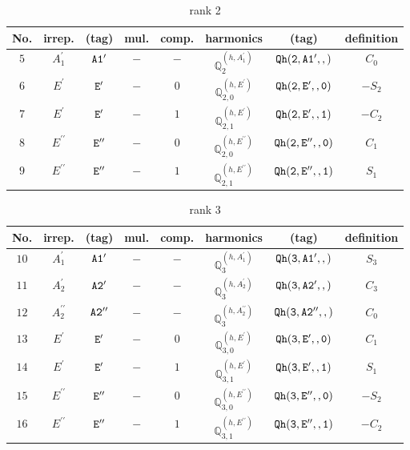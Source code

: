 \documentclass[fleqn,8pt]{jsarticle}
\begin{document}
\begin{table}[ht!]
\begin{center}
\caption{rank 2}
\renewcommand{\arraystretch}{1.3}
\begin{tabular}{cccccccc} \hline \hline
No. & irrep. & (tag) & mul. & comp. & harmonics & (tag) & definition \\ \hline
$ 5 $ & $ A_{1}^{\prime} $ & $ {\tt A1'} $ & $ - $ & $ - $ & $ \mathbb{Q}_{2}^{(h,A_{1}^{\prime})} $ & $ {\tt Qh(2,A1',,)} $ & $ C_{0} $ \\
$ 6 $ & $ E^{\prime} $ & $ {\tt E'} $ & $ - $ & $ 0 $ & $ \mathbb{Q}_{2,0}^{(h,E^{\prime})} $ & $ {\tt Qh(2,E',,0)} $ & $ - S_{2} $ \\
$ 7 $ & $ E^{\prime} $ & $ {\tt E'} $ & $ - $ & $ 1 $ & $ \mathbb{Q}_{2,1}^{(h,E^{\prime})} $ & $ {\tt Qh(2,E',,1)} $ & $ - C_{2} $ \\
$ 8 $ & $ E^{\prime\prime} $ & $ {\tt E''} $ & $ - $ & $ 0 $ & $ \mathbb{Q}_{2,0}^{(h,E^{\prime\prime})} $ & $ {\tt Qh(2,E'',,0)} $ & $ C_{1} $ \\
$ 9 $ & $ E^{\prime\prime} $ & $ {\tt E''} $ & $ - $ & $ 1 $ & $ \mathbb{Q}_{2,1}^{(h,E^{\prime\prime})} $ & $ {\tt Qh(2,E'',,1)} $ & $ S_{1} $ \\
 \hline \hline
\end{tabular}
\end{center}
\end{table}
\begin{table}[ht!]
\begin{center}
\caption{rank 3}
\renewcommand{\arraystretch}{1.3}
\begin{tabular}{cccccccc} \hline \hline
No. & irrep. & (tag) & mul. & comp. & harmonics & (tag) & definition \\ \hline
$ 10 $ & $ A_{1}^{\prime} $ & $ {\tt A1'} $ & $ - $ & $ - $ & $ \mathbb{Q}_{3}^{(h,A_{1}^{\prime})} $ & $ {\tt Qh(3,A1',,)} $ & $ S_{3} $ \\
$ 11 $ & $ A_{2}^{\prime} $ & $ {\tt A2'} $ & $ - $ & $ - $ & $ \mathbb{Q}_{3}^{(h,A_{2}^{\prime})} $ & $ {\tt Qh(3,A2',,)} $ & $ C_{3} $ \\
$ 12 $ & $ A_{2}^{\prime\prime} $ & $ {\tt A2''} $ & $ - $ & $ - $ & $ \mathbb{Q}_{3}^{(h,A_{2}^{\prime\prime})} $ & $ {\tt Qh(3,A2'',,)} $ & $ C_{0} $ \\
$ 13 $ & $ E^{\prime} $ & $ {\tt E'} $ & $ - $ & $ 0 $ & $ \mathbb{Q}_{3,0}^{(h,E^{\prime})} $ & $ {\tt Qh(3,E',,0)} $ & $ C_{1} $ \\
$ 14 $ & $ E^{\prime} $ & $ {\tt E'} $ & $ - $ & $ 1 $ & $ \mathbb{Q}_{3,1}^{(h,E^{\prime})} $ & $ {\tt Qh(3,E',,1)} $ & $ S_{1} $ \\
$ 15 $ & $ E^{\prime\prime} $ & $ {\tt E''} $ & $ - $ & $ 0 $ & $ \mathbb{Q}_{3,0}^{(h,E^{\prime\prime})} $ & $ {\tt Qh(3,E'',,0)} $ & $ - S_{2} $ \\
$ 16 $ & $ E^{\prime\prime} $ & $ {\tt E''} $ & $ - $ & $ 1 $ & $ \mathbb{Q}_{3,1}^{(h,E^{\prime\prime})} $ & $ {\tt Qh(3,E'',,1)} $ & $ - C_{2} $ \\
 \hline \hline
\end{tabular}
\end{center}
\end{table}
\end{document}
